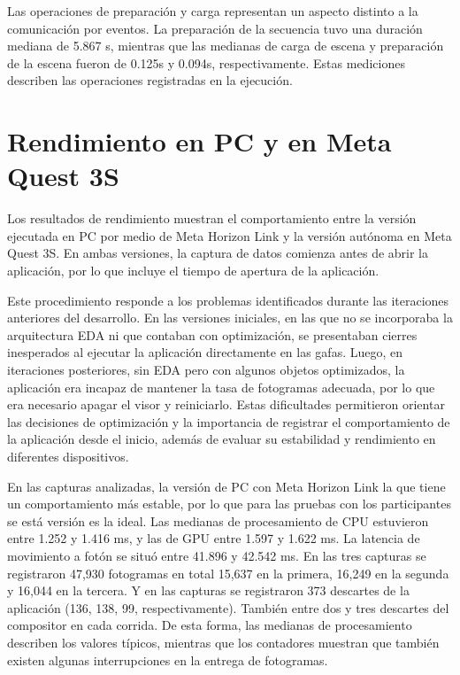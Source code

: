 Las operaciones de preparación y carga representan un aspecto distinto a la comunicación por eventos. 
La preparación de la secuencia tuvo una duración mediana de 5.867 s, mientras que las medianas de carga de escena y preparación de la escena fueron de 0.125s y 0.094s, respectivamente. 
Estas mediciones describen las operaciones registradas en la ejecución. 

\section{Rendimiento en PC y en Meta Quest 3S}
Los resultados de rendimiento muestran el comportamiento entre la versión ejecutada en PC por medio de Meta Horizon Link y
la versión autónoma en Meta Quest 3S. En ambas versiones, la captura de datos comienza antes de abrir la aplicación, 
por lo que incluye el tiempo de apertura de la aplicación.

Este procedimiento responde a los problemas identificados durante las iteraciones anteriores del desarrollo. 
En las versiones iniciales, en las que no se incorporaba la arquitectura EDA ni que contaban con optimización, 
se presentaban cierres inesperados al ejecutar la aplicación directamente en las gafas. 
Luego, en iteraciones posteriores, sin EDA pero con algunos objetos optimizados, la aplicación
era incapaz de mantener la tasa de fotogramas adecuada, por lo que era necesario apagar el visor y reiniciarlo. 
Estas dificultades permitieron orientar las decisiones de optimización y la importancia de registrar el comportamiento de la aplicación
desde el inicio, además de evaluar su estabilidad y rendimiento en diferentes dispositivos. 

En las capturas analizadas, la versión de PC con Meta Horizon Link la que tiene un comportamiento más estable, 
por lo que para las pruebas con los participantes se está versión es la ideal.
Las medianas de procesamiento de CPU estuvieron entre 1.252 y 1.416 ms, 
y las de GPU entre 1.597 y 1.622 ms. La latencia de movimiento a fotón se situó entre 41.896 y 42.542 ms. 
En las tres capturas se registraron 47,930 fotogramas en total 15,637 en la primera, 16,249 en la segunda y 16,044 en la tercera. 
Y en las capturas se registraron 373 descartes de la aplicación (136, 138, 99, respectivamente).
También entre dos y tres descartes del compositor en cada corrida. 
De esta forma, las medianas de procesamiento describen los valores típicos, mientras que los contadores muestran que también existen algunas interrupciones en la entrega de fotogramas.

